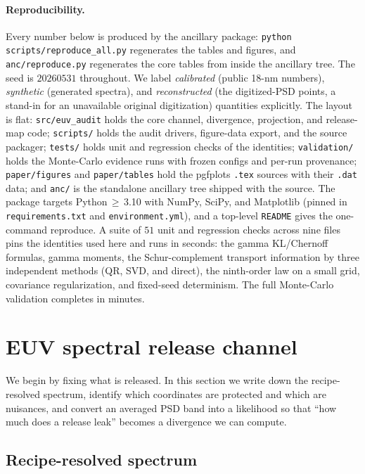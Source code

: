 \documentclass[11pt]{article}
\begin{document}
\paragraph{Reproducibility.} Every number below is produced by the ancillary package: \texttt{python scripts/reproduce\_all.py} regenerates the tables and figures, and \texttt{anc/reproduce.py} regenerates the core tables from inside the ancillary tree. The seed is \(20260531\) throughout. We label \emph{calibrated} (public 18-nm numbers), \emph{synthetic} (generated spectra), and \emph{reconstructed} (the digitized-PSD points, a stand-in for an unavailable original digitization) quantities explicitly. The layout is flat: \texttt{src/euv\_audit} holds the core channel, divergence, projection, and release-map code; \texttt{scripts/} holds the audit drivers, figure-data export, and the source packager; \texttt{tests/} holds unit and regression checks of the identities; \texttt{validation/} holds the Monte-Carlo evidence runs with frozen configs and per-run provenance; \texttt{paper/figures} and \texttt{paper/tables} hold the pgfplots \texttt{.tex} sources with their \texttt{.dat} data; and \texttt{anc/} is the standalone ancillary tree shipped with the source. The package targets Python\,\(\ge\)\,3.10 with NumPy, SciPy, and Matplotlib (pinned in \texttt{requirements.txt} and \texttt{environment.yml}), and a top-level \texttt{README} gives the one-command reproduce. A suite of \(51\) unit and regression checks across nine files pins the identities used here and runs in seconds: the gamma KL/Chernoff formulas, gamma moments, the Schur-complement transport information by three independent methods (QR, SVD, and direct), the ninth-order law on a small grid, covariance regularization, and fixed-seed determinism. The full Monte-Carlo validation completes in minutes.

\section{EUV spectral release channel}
\label{sec:channel}

We begin by fixing what is released. In this section we write down the recipe-resolved spectrum, identify which coordinates are protected and which are nuisances, and convert an averaged PSD band into a likelihood so that ``how much does a release leak'' becomes a divergence we can compute.

\subsection{Recipe-resolved spectrum}
\end{document}
